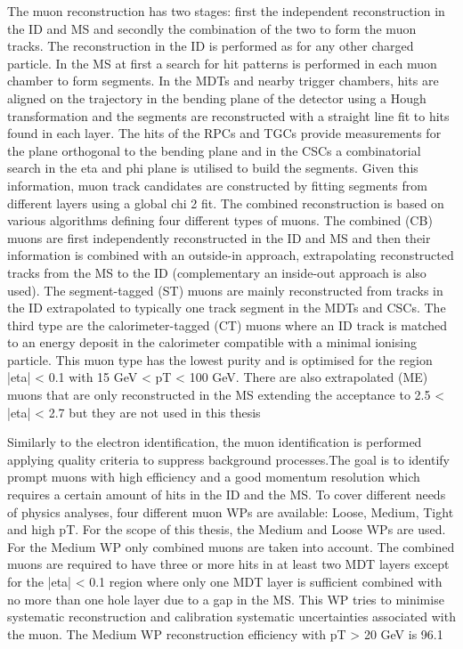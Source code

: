 The muon reconstruction has two stages: first the independent reconstruction in the ID and MS
and secondly the combination of the two to form the muon tracks. The reconstruction in the ID is
performed as for any other charged particle.
In the MS at first a search for hit patterns is performed in each muon chamber to form segments. In
the MDTs and nearby trigger chambers, hits are aligned on the trajectory in the bending plane of
the detector using a Hough transformation and the segments are reconstructed with a straight line
fit to hits found in each layer. The hits of the RPCs and TGCs provide measurements for the plane
orthogonal to the bending plane and in the CSCs a combinatorial search in the eta and phi plane is
utilised to build the segments. Given this information, muon track candidates are constructed by
fitting segments from different layers using a global chi
2 fit.
The combined reconstruction is based on various algorithms defining four different types of muons.
The combined (CB) muons are first independently reconstructed in the ID and MS and then their
information is combined with an outside-in approach, extrapolating reconstructed tracks from the MS
to the ID (complementary an inside-out approach is also used). The segment-tagged (ST) muons are
mainly reconstructed from tracks in the ID extrapolated to typically one track segment in the MDTs
and CSCs. The third type are the calorimeter-tagged (CT) muons where an ID track is matched to an
energy deposit in the calorimeter compatible with a minimal ionising particle. This muon type has
the lowest purity and is optimised for the region |eta| < 0.1 with 15 GeV < pT < 100 GeV. There
are also extrapolated (ME) muons that are only reconstructed in the MS extending the acceptance to
2.5 < |eta| < 2.7 but they are not used in this thesis

Similarly to the electron identification, the muon identification is performed applying quality criteria
to suppress background processes.The goal is to identify prompt muons with high efficiency and a
good momentum resolution which requires a certain amount of hits in the ID and the MS. To cover
different needs of physics analyses, four different muon WPs are available: Loose, Medium, Tight
and high pT. For the scope of this thesis, the Medium and Loose WPs are used.
For the Medium WP only combined muons are taken into account. The combined muons are required
to have three or more hits in at least two MDT layers except for the |eta| < 0.1 region where only one
MDT layer is sufficient combined with no more than one hole layer due to a gap in the MS. This WP
tries to minimise systematic reconstruction and calibration systematic uncertainties associated with
the muon. The Medium WP reconstruction efficiency with pT > 20 GeV is 96.1%

